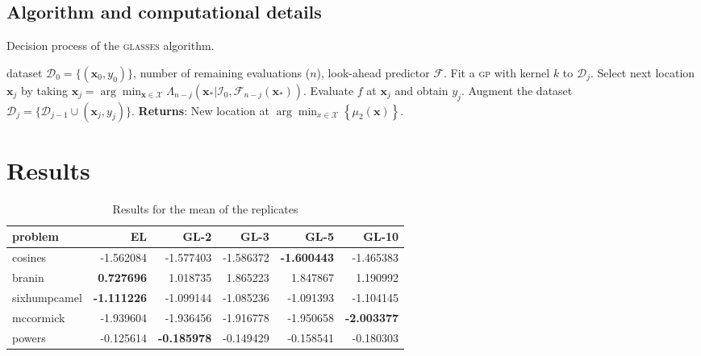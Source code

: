 \documentclass[twoside]{article}
\newcommand{\I}{\mathcal{I}}
\newcommand{\bx}{\textbf{x}}
\newcommand{\future}{\mathcal{F}}
\newcommand{\acr}[1]{\textsc{#1}\xspace}
\newcommand{\gp}{\acr{gp}}
\newcommand{\us}{\acr{glasses}}
\begin{document}
\subsection{Algorithm and computational details}


\begin{algorithm*}[t!]
   \caption{Decision process of the \us algorithm.}
   \label{alg:glasses}
\begin{algorithmic}
    dataset $\mathcal{D}_{0} = \{(\textbf{x}_0, y_0)\}$, number of remaining evaluations ($n$), look-ahead predictor $\future$.
   \STATE Fit a \gp with kernel $k$ to $\mathcal{D}_{j}$.
   \STATE Select next location $\bx_j$ by taking  $\bx_j = \arg \min_{\bx \in {\mathcal X}}\Lambda_{n-j}(\bx_*|\I_0, \future_{n-j}(\bx_*) )$.
   \STATE Evaluate $f$ at $\bx_j$ and obtain $y_j$.
   \STATE Augment the dataset $\mathcal{D}_{j} = \{\mathcal{D}_{j-1} \cup (\textbf{x}_j, y_j)\}$.
   \ENDFOR
   \STATE \textbf{Returns}: New location at $\arg \min_{x \in \mathcal{X}} \left\{\mu_2(\bx)\right\}$.  
\end{algorithmic}
\end{algorithm*}

\section{Results}

\begin{table*}
\begin{tabular}{lrrrrr}
\toprule
      problem &        EL &      GL-2 &      GL-3 &      GL-5 &     GL-10 \\
\midrule
      cosines & -1.562084 & -1.577403 & -1.586372 & \textbf{-1.600443} & -1.465383 \\
       branin &  \textbf{0.727696} &  1.018735 &  1.865223 &  1.847867 &  1.190992 \\
 sixhumpcamel & \textbf{-1.111226} & -1.099144 & -1.085236 & -1.091393 & -1.104145 \\
    mccormick & -1.939604 & -1.936456 & -1.916778 & -1.950658 & \textbf{-2.003377} \\
       powers & -0.125614 & \textbf{-0.185978} & -0.149429 & -0.158541 & -0.180303 \\
\bottomrule
\end{tabular}\caption{Results for the mean of the replicates}
\end{table*}
\end{document}
